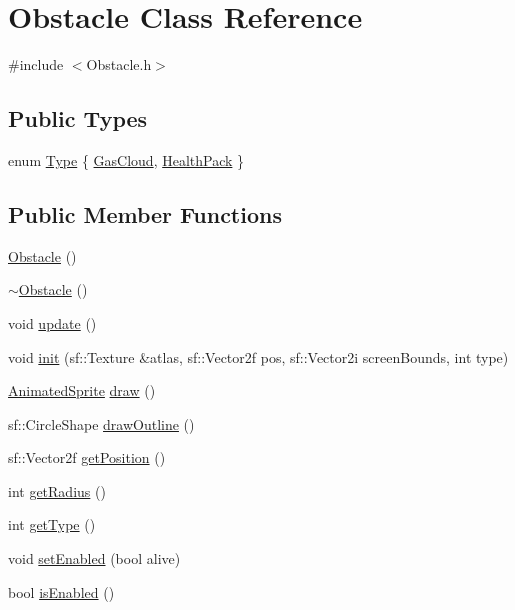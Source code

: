 \hypertarget{class_obstacle}{}\section{Obstacle Class Reference}
\label{class_obstacle}


{\ttfamily \#include $<$Obstacle.\+h$>$}

\subsection*{Public Types}
\begin{DoxyCompactItemize}
\item 
enum \hyperlink{class_obstacle_aef5f840b29b95afb87fb27883d89f5fa}{Type} \{ \hyperlink{class_obstacle_aef5f840b29b95afb87fb27883d89f5faad988b9af015231c41987f68cd184c15c}{Gas\+Cloud}, 
\hyperlink{class_obstacle_aef5f840b29b95afb87fb27883d89f5faa3af525a9e6a9d6ef664dfc9a7080f2de}{Health\+Pack}
 \}
\end{DoxyCompactItemize}
\subsection*{Public Member Functions}
\begin{DoxyCompactItemize}
\item 
\hyperlink{class_obstacle_a8f734072321fa06a7b7dae2d5f50f352}{Obstacle} ()
\item 
\hyperlink{class_obstacle_af2f9cc9c6cff75dca0974fd5ac4f71a9}{$\sim$\+Obstacle} ()
\item 
void \hyperlink{class_obstacle_a3fe041a93f5b2e9e5c5750bcef2382a4}{update} ()
\item 
void \hyperlink{class_obstacle_a360ec5da9397222a1699c6c6cd8bd5c4}{init} (sf\+::\+Texture \&atlas, sf\+::\+Vector2f pos, sf\+::\+Vector2i screen\+Bounds, int type)
\item 
\hyperlink{class_animated_sprite}{Animated\+Sprite} \hyperlink{class_obstacle_add40c7f26670ee029480df409794269f}{draw} ()
\item 
sf\+::\+Circle\+Shape \hyperlink{class_obstacle_aa353922843ff431a387e8988bc5f5364}{draw\+Outline} ()
\item 
sf\+::\+Vector2f \hyperlink{class_obstacle_a9717d2aec256d18e12d773e42e2c5034}{get\+Position} ()
\item 
int \hyperlink{class_obstacle_af618239790edb9fc94a984f8bb281c3e}{get\+Radius} ()
\item 
int \hyperlink{class_obstacle_ad28c6a458187a5f5ec68c8cc3c425114}{get\+Type} ()
\item 
void \hyperlink{class_obstacle_acce43c25bc4336bcd1d2ceb443d50a54}{set\+Enabled} (bool alive)
\item 
bool \hyperlink{class_obstacle_a3e5e80b8d4f5e46636bd5fa960621270}{is\+Enabled} ()
\end{DoxyCompactItemize}


